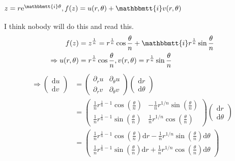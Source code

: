 \documentclass[]{ctexart}
\newcommand{\mi}{\mathbbmtt{i}}
\newcommand{\di}{\mathrm{d}}
\newcommand{\pa}{\partial}
\newcommand{\me}{\mathrm{e}}
\begin{document}
		\subsubsection{$z=r\me ^{\mi \theta},f(z)=u(r,\theta)+\mi v(r,\theta)$}
			I think nobody will do this and read this. 
				\begin{equation*}
				\begin{aligned}
					f(z)&=z^{\frac{1}{n}}=r^{\frac{1}{n}}\cos \frac{\theta}{n}+\mi r^{\frac{1}{n}}\sin \frac{\theta}{n}\\
					\Rightarrow u(r,\theta)&=r^{\frac{1}{n}}\cos \frac{\theta}{n},v(r,\theta)=r^{\frac{1}{n}}\sin \frac{\theta}{n}
				\end{aligned}
				\end{equation*}
				\begin{equation*}
				\begin{aligned}
					\Rightarrow 
					\begin{pmatrix}
						\di u\\
						\di v
					\end{pmatrix}
					&=
					\begin{pmatrix}
						\pa_ru & \pa_{\theta}u\\
						\pa_rv & \pa_{\theta}v
					\end{pmatrix}
					\begin{pmatrix}
						\di r\\
						\di \theta
					\end{pmatrix}\\
					&=
					\begin{pmatrix}
						\frac{1}{n}r^{\frac{1}{n}-1} \cos \left(\frac{\theta }{n}\right) & -\frac{1}{n}r^{1/n} \sin \left(\frac{\theta }{n}\right)\\
						\frac{1}{n}r^{\frac{1}{n}-1} \sin \left(\frac{\theta }{n}\right) & \frac{1}{n}r^{1/n} \cos \left(\frac{\theta }{n}\right)
					\end{pmatrix}
					\begin{pmatrix}
						\di r\\
						\di \theta
					\end{pmatrix}\\
					&=
					\begin{pmatrix}
						\frac{1}{n}r^{\frac{1}{n}-1} \cos \left(\frac{\theta }{n}\right)\di r-\frac{1}{n}r^{1/n} \sin \left(\frac{\theta }{n}\right)\di \theta\\
						\frac{1}{n}r^{\frac{1}{n}-1} \sin \left(\frac{\theta }{n}\right)\di r + \frac{1}{n}r^{1/n} \cos \left(\frac{\theta }{n}\right)\di \theta
					\end{pmatrix}
				\end{aligned}
				\end{equation*}
\end{document}
